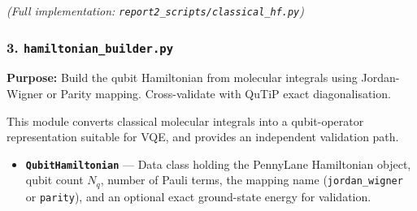 \documentclass[
  11pt,
]{report}
\providecommand{\tightlist}{%
  \setlength{\itemsep}{0pt}\setlength{\parskip}{0pt}}
\begin{document}
\emph{(Full implementation: \texttt{report2\_scripts/classical\_hf.py})}

\subsubsection{\texorpdfstring{3.
\texttt{hamiltonian\_builder.py}}{3. hamiltonian\_builder.py}}\label{hamiltonian_builder.py}

\textbf{Purpose:} Build the qubit Hamiltonian from molecular integrals
using Jordan-Wigner or Parity mapping. Cross-validate with QuTiP exact
diagonalisation.

This module converts classical molecular integrals into a qubit-operator
representation suitable for VQE, and provides an independent validation
path.

\begin{itemize}
\tightlist
\item
  \textbf{\texttt{QubitHamiltonian}} --- Data class holding the
  PennyLane Hamiltonian object, qubit count \(N_q\), number of Pauli
  terms, the mapping name
  (\texttt{\textquotesingle{}jordan\_wigner\textquotesingle{}} or
  \texttt{\textquotesingle{}parity\textquotesingle{}}), and an optional
  exact ground-state energy for validation.
\end{itemize}
\end{document}

